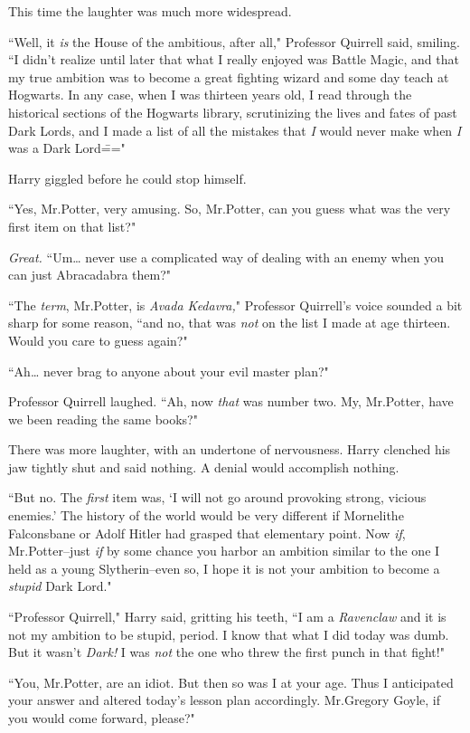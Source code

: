 This time the laughter was much more widespread.

``Well, it \emph{is} the House of the ambitious, after all," Professor Quirrell said, smiling. ``I didn't realize until later that what I really enjoyed was Battle Magic, and that my true ambition was to become a great fighting wizard and some day teach at Hogwarts. In any case, when I was thirteen years old, I read through the historical sections of the Hogwarts library, scrutinizing the lives and fates of past Dark Lords, and I made a list of all the mistakes that \emph{I} would never make when \emph{I} was a Dark Lord\==="

Harry giggled before he could stop himself.

``Yes, Mr.\?Potter, very amusing. So, Mr.\?Potter, can you guess what was the very first item on that list?"

\emph{Great.} ``Um{\ldots} never use a complicated way of dealing with an enemy when you can just Abracadabra them?"

``The \emph{term}, Mr.\?Potter, is \emph{Avada Kedavra,}" Professor Quirrell's voice sounded a bit sharp for some reason, ``and no, that was \emph{not} on the list I made at age thirteen. Would you care to guess again?"

``Ah{\ldots} never brag to anyone about your evil master plan?"

Professor Quirrell laughed. ``Ah, now \emph{that} was number two. My, Mr.\?Potter, have we been reading the same books?"

There was more laughter, with an undertone of nervousness. Harry clenched his jaw tightly shut and said nothing. A denial would accomplish nothing.

``But no. The \emph{first} item was, `I will not go around provoking strong, vicious enemies.' The history of the world would be very different if Mornelithe Falconsbane or Adolf Hitler had grasped that elementary point. Now \emph{if}, Mr.\?Potter\---just \emph{if} by some chance you harbor an ambition similar to the one I held as a young Slytherin\---even so, I hope it is not your ambition to become a \emph{stupid} Dark Lord."

``Professor Quirrell," Harry said, gritting his teeth, ``I am a \emph{Ravenclaw} and it is not my ambition to be stupid, period. I know that what I did today was dumb. But it wasn't \emph{Dark!} I was \emph{not} the one who threw the first punch in that fight!"

``You, Mr.\?Potter, are an idiot. But then so was I at your age. Thus I anticipated your answer and altered today's lesson plan accordingly. Mr.\?Gregory Goyle, if you would come forward, please?"

